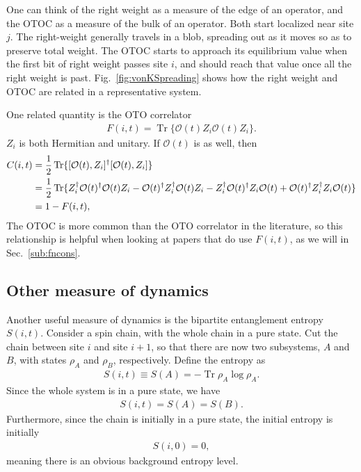 \documentclass[a4paper,11pt]{article}
\renewcommand{\cal}{\mathcal}
\newcommand{\half}{\frac{1}{2}}
\newcommand{\nn}{\nonumber\\}
\DeclareMathOperator{\Tr}{Tr}
\let\Re\relax
\DeclareMathOperator{\Re}{Re}
\begin{document}
One can think of the right weight as a measure of the edge of an operator, and the OTOC as a measure of the bulk of an operator. Both start localized near site $j$. The right-weight generally travels in a blob, spreading out as it moves so as to preserve total weight. The OTOC starts to approach its equilibrium value when the first bit of right weight passes site $i$, and should reach that value once all the right weight is past.
Fig.~\ref{fig:vonKSpreading} shows how the right weight and OTOC are related in a representative system.

One related quantity is the OTO correlator 
\begin{align}
F(i,t) = \Tr\{\cal{O}(t) Z_i\cal{O}(t) Z_i\}.
\end{align}
$Z_i$ is both Hermitian and unitary. If $\cal{O}(t)$ is as well, then
\begin{align}
C(i,t) &= \half \Tr \{[\cal{O}(t), Z_i]^\dag [\cal{O}(t), Z_i] \}\nn
&= \half \Tr\{Z_i^\dag \cal{O}(t)^\dag \cal{O}(t) Z_i - \cal{O}(t)^\dag Z_i^\dag \cal{O}(t) Z_i - Z_i^\dag \cal{O}(t)^\dag Z_i \cal{O}(t) + \cal{O}(t)^\dag Z_i^\dag Z_i \cal{O}(t) \} \nn
&= 1-\Re F(i,t), \label{eqn:OTOCOTO}
\end{align}
The OTOC is more common than the OTO correlator in the literature, so this relationship is helpful when looking at papers that do use $F(i,t)$, as we will in Sec.~\ref{sub:fncons}.

\subsection{Other measure of dynamics} \label{sub:other}

Another useful measure of dynamics is the bipartite entanglement entropy $S(i,t)$. Consider a spin chain, with the whole chain in a pure state. Cut the chain between site $i$ and site $i+1$, so that there are now two subsystems, $A$ and $B$, with states $\rho_A$ and $\rho_B$, respectively. Define the entropy as 
\begin{align}
S(i,t) \equiv S(A) = -\Tr\rho_A\log\rho_A.
\end{align}
Since the whole system is in a pure state, we have
\begin{align}
S(i,t)=S(A)=S(B).
\end{align}
Furthermore, since the chain is initially in a pure state, the initial entropy is initially
\begin{align}
S(i,0)= 0,
\end{align}
meaning there is an obvious background entropy level.
\end{document}

